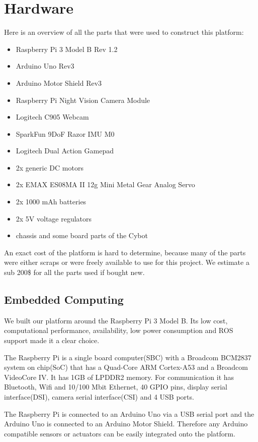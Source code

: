 \documentclass[class=article, crop=false]{standalone}
\begin{document}
\section{Hardware}\label{sec:hardware}
Here is an overview of all the parts that were used to construct this platform:

\begin{itemize}
 \item Raspberry Pi 3 Model B Rev 1.2
 \item Arduino Uno Rev3
 \item Arduino Motor Shield Rev3
 \item Raspberry Pi Night Vision Camera Module
 \item Logitech C905 Webcam
 \item SparkFun 9DoF Razor IMU M0
 \item Logitech Dual Action Gamepad
 \item 2x generic DC motors
 \item 2x EMAX ES08MA II 12g Mini Metal Gear Analog Servo
 \item 2x 1000 mAh batteries
 \item 2x 5V voltage regulators
 \item chassis and some board parts of the Cybot
\end{itemize}

An exact cost of the platform is hard to determine, because many of the parts were either scraps or were freely available to use for this project. We estimate a sub 200\$ for all the parts used if bought new.

\subsection{Embedded Computing}\label{subsec:soc}
We built our platform around the Raspberry Pi 3 Model B. Its low cost, computational performance, availability, low power consumption and ROS support made it a clear choice.

The Raspberry Pi is a single board computer(SBC) with a Broadcom BCM2837 system on chip(SoC) that has a Quad-Core ARM Cortex-A53 and a Broadcom VideoCore IV. It has 1GB of LPDDR2 memory. For communication it has Bluetooth, Wifi and 10/100 Mbit Ethernet, 40 GPIO pins, display serial interface(DSI), camera serial interface(CSI) and 4 USB ports\footnotemark.


The Raspberry Pi is connected to an Arduino Uno via a USB serial port and the Arduino Uno is connected to an Arduino Motor Shield. Therefore any Arduino compatible sensors or actuators can be easily integrated onto the platform.
\end{document}
